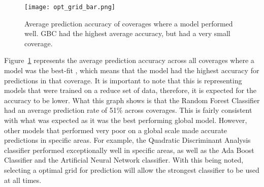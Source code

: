 \begin{figure}[htp]
    \centering
    \texttt{[image: opt\_grid\_bar.png]}
    \caption{Average prediction accuracy of coverages where a model performed well. 
    GBC had the highest average accuracy, but had a very small coverage.}
    \label{fig:grid_opt_graph}
\end{figure}

\par
Figure~\ref{fig:grid_opt_graph} represents the average prediction accuracy across all coverages where a model was the best-fit
, which means that the model had the highest accuracy for predictions in that coverage.
It is important to note that this is representing models that were trained on a reduce set of data, therefore, it is expected for the accuracy to be lower.
What this graph shows is that the Random Forest Classifier had an average prediction rate of 51\% across coverages.
This is fairly consistent with what was expected as it was the best performing global model. 
However, other models that performed very poor on a global scale made accurate predictions in specific areas.
For example, the Quadratic Discriminant Analysis classifier performed exceptionally well in specific areas, as well as the Ada Boost Classifier and the Artificial Neural Network classifier.
With this being noted, selecting a optimal grid for prediction will allow the strongest classifier to be used at all times.



